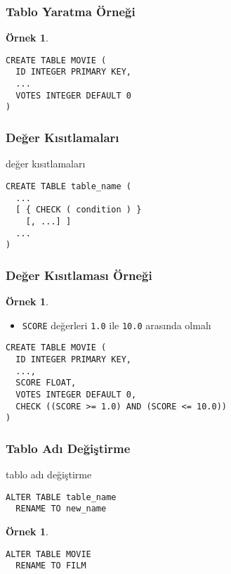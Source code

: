 \documentclass[dvipsnames]{beamer}
\theoremstyle{definition}
\theoremstyle{example}
\newtheorem{ornek}[theorem]{Örnek}
\theoremstyle{plain}
\begin{document}
\begin{frame}[fragile]
  \frametitle{Tablo Yaratma Örneği}

  \begin{ornek}
    \begin{lstlisting}
CREATE TABLE MOVIE (
  ID INTEGER PRIMARY KEY,
  ...
  VOTES INTEGER DEFAULT 0
)
    \end{lstlisting}
  \end{ornek}
\end{frame}

\begin{frame}[fragile]
  \frametitle{Değer Kısıtlamaları}

  \begin{block}{değer kısıtlamaları}
    \begin{lstlisting}
CREATE TABLE table_name (
  ...
  [ { CHECK ( condition ) }
    [, ...] ]
  ...
)
    \end{lstlisting}
  \end{block}
\end{frame}

\begin{frame}[fragile]
  \frametitle{Değer Kısıtlaması Örneği}

  \begin{ornek}
    \begin{itemize}
      \item \texttt{SCORE} değerleri \texttt{1.0} ile \texttt{10.0} arasında
        olmalı
    \end{itemize}

    \begin{lstlisting}
CREATE TABLE MOVIE (
  ID INTEGER PRIMARY KEY,
  ...,
  SCORE FLOAT,
  VOTES INTEGER DEFAULT 0,
  CHECK ((SCORE >= 1.0) AND (SCORE <= 10.0))
)
    \end{lstlisting}
  \end{ornek}
\end{frame}

\begin{frame}[fragile]
  \frametitle{Tablo Adı Değiştirme}

  \begin{block}{tablo adı değiştirme}
    \begin{lstlisting}
ALTER TABLE table_name
  RENAME TO new_name
    \end{lstlisting}
  \end{block}

  \pause
  \medskip
  \begin{ornek}
    \begin{lstlisting}
ALTER TABLE MOVIE
  RENAME TO FILM
    \end{lstlisting}
  \end{ornek}
\end{frame}
\end{document}
